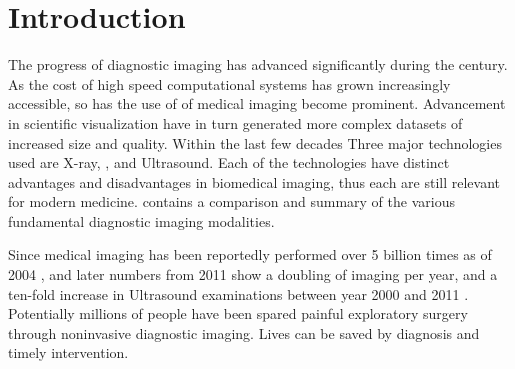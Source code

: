 \chapter{Introduction} \label{cha:introduction}
The progress of diagnostic imaging has advanced significantly during the  century. As the cost of high speed computational systems has grown increasingly accessible, so has the use of of medical imaging become prominent. Advancement in scientific visualization have in turn generated more complex datasets of increased size and quality. Within the last few decades
Three major technologies used are X-ray, , and Ultrasound. Each of the technologies have distinct advantages and disadvantages in biomedical imaging, thus each are still relevant for modern medicine.  contains a comparison and summary of the various fundamental diagnostic imaging modalities.

Since medical imaging has been reportedly performed over 5 billion times as of 2004 \cite{Picano2004}, and later numbers from 2011 show a doubling of imaging per year, and a ten-fold increase in Ultrasound examinations between year 2000 and 2011 \cite{Szabo_UltrasoundBook_2}. Potentially millions of people have been spared painful exploratory surgery through noninvasive diagnostic imaging. Lives can be saved by diagnosis and timely intervention. 

